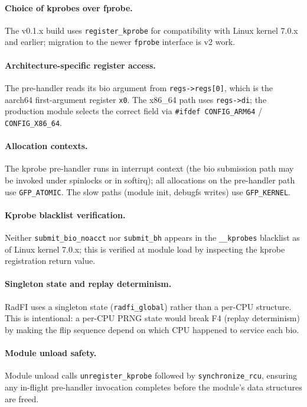 \paragraph{Choice of kprobes over fprobe.}
The v0.1.x build uses \texttt{register\_kprobe}\cite{kernel-kprobes}
for compatibility with Linux kernel 7.0.x and earlier; migration
to the newer \texttt{fprobe} interface is v2 work.

\paragraph{Architecture-specific register access.}
The pre-handler reads its bio argument from \texttt{regs->regs[0]},
which is the aarch64 first-argument register \texttt{x0}. The
x86\_64 path uses \texttt{regs->di}; the production module selects
the correct field via \texttt{\#ifdef CONFIG\_ARM64} /
\texttt{CONFIG\_X86\_64}.

\paragraph{Allocation contexts.}
The kprobe pre-handler runs in interrupt context (the bio submission
path may be invoked under spinlocks or in softirq); all allocations
on the pre-handler path use \texttt{GFP\_ATOMIC}. The slow paths
(module init, debugfs writes) use \texttt{GFP\_KERNEL}.

\paragraph{Kprobe blacklist verification.}
Neither \texttt{submit\_bio\_noacct} nor \texttt{submit\_bh} appears
in the \texttt{\_\_kprobes} blacklist as of Linux kernel 7.0.x; this
is verified at module load by inspecting the kprobe
registration return value.

\paragraph{Singleton state and replay determinism.}
RadFI uses a singleton state (\texttt{radfi\_global}) rather than a
per-CPU structure. This is intentional: a per-CPU PRNG state would
break F4 (replay determinism) by making the flip sequence depend on
which CPU happened to service each bio.

\paragraph{Module unload safety.}
Module unload calls \texttt{unregister\_kprobe} followed by
\texttt{synchronize\_rcu}, ensuring any in-flight pre-handler
invocation completes before the module's data structures are freed.


